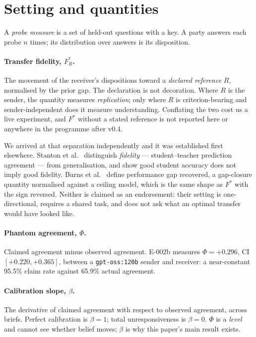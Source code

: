 \documentclass[11pt]{article}
\begin{document}
\section{Setting and quantities}

A \emph{probe measure} is a set of held-out questions with a key. A party
answers each probe $n$ times; its distribution over answers is its disposition.

\paragraph{Transfer fidelity, $F^*_R$.} The movement of the receiver's
dispositions toward a \emph{declared reference} $R$, normalised by the prior gap.
The declaration is not decoration. Where $R$ is the sender, the quantity measures
\emph{replication}; only where $R$ is criterion-bearing and sender-independent
does it measure understanding. Conflating the two cost us a live experiment, and
$F^*$ without a stated reference is not reported here or anywhere in the
programme after v0.4.

We arrived at that separation independently and it was established first
elsewhere. Stanton et al.~\cite{stanton2021} distinguish \emph{fidelity} ---
student--teacher prediction agreement --- from generalisation, and show good
student accuracy does not imply good fidelity. Burns et al.~\cite{burns2024}
define performance gap recovered, a gap-closure quantity normalised against a
ceiling model, which is the same shape as $F^*$ with the sign reversed. Neither
is claimed as an endorsement: their setting is one-directional, requires a shared
task, and does not ask what an optimal transfer would have looked like.

\paragraph{Phantom agreement, $\Phi$.} Claimed agreement minus observed
agreement. E-002b measures $\Phi = +0.296$, CI $[+0.220, +0.365]$, between a
\texttt{gpt-oss:120b} sender and receiver: a near-constant 95.5\% claim rate
against 65.9\% actual agreement.

\paragraph{Calibration slope, $\beta$.} The derivative of claimed agreement with
respect to observed agreement, across briefs. Perfect calibration is $\beta = 1$;
total unresponsiveness is $\beta = 0$. $\Phi$ is a \emph{level} and cannot see
whether belief moves; $\beta$ is why this paper's main result exists.
\end{document}
